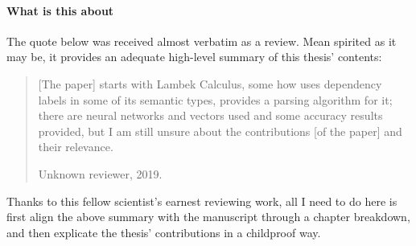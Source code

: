 {{	\paragraph{What is this about}
	The quote below was received almost verbatim as a review.
	Mean spirited as it may be, it provides an adequate high-level summary of this thesis' contents: 
	\begin{quote}
	[The paper] starts with Lambek Calculus, some how uses dependency labels in some of its semantic types, provides a parsing algorithm for it; there are neural networks and vectors used and some accuracy results provided, but I am still unsure about the contributions [of the paper] and their relevance.
	\begin{flushright} Unknown reviewer, 2019.\end{flushright}
	\end{quote}\goodbreak
	
	\noindent Thanks to this fellow scientist's earnest reviewing work, all I need to do here is first align the above summary with the manuscript through a chapter breakdown, and then explicate the thesis' contributions in a childproof way.
}

}
